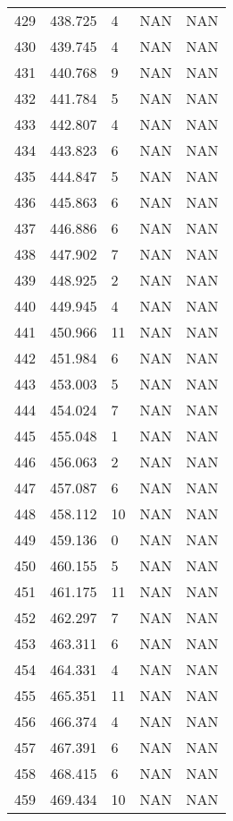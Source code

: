 \documentclass{article}
\begin{document}
\begin{longtable}{@{}lllll@{}}
				429 & 438.725 & 4     & NAN   & NAN   \\
				430 & 439.745 & 4     & NAN   & NAN   \\
				431 & 440.768 & 9     & NAN   & NAN   \\
				432 & 441.784 & 5     & NAN   & NAN   \\
				433 & 442.807 & 4     & NAN   & NAN   \\
				434 & 443.823 & 6     & NAN   & NAN   \\
				435 & 444.847 & 5     & NAN   & NAN   \\
				436 & 445.863 & 6     & NAN   & NAN   \\
				437 & 446.886 & 6     & NAN   & NAN   \\
				438 & 447.902 & 7     & NAN   & NAN   \\
				439 & 448.925 & 2     & NAN   & NAN   \\
				440 & 449.945 & 4     & NAN   & NAN   \\
				441 & 450.966 & 11    & NAN   & NAN   \\
				442 & 451.984 & 6     & NAN   & NAN   \\
				443 & 453.003 & 5     & NAN   & NAN   \\
				444 & 454.024 & 7     & NAN   & NAN   \\
				445 & 455.048 & 1     & NAN   & NAN   \\
				446 & 456.063 & 2     & NAN   & NAN   \\
				447 & 457.087 & 6     & NAN   & NAN   \\
				448 & 458.112 & 10    & NAN   & NAN   \\
				449 & 459.136 & 0     & NAN   & NAN   \\
				450 & 460.155 & 5     & NAN   & NAN   \\
				451 & 461.175 & 11    & NAN   & NAN   \\
				452 & 462.297 & 7     & NAN   & NAN   \\
				453 & 463.311 & 6     & NAN   & NAN   \\
				454 & 464.331 & 4     & NAN   & NAN   \\
				455 & 465.351 & 11    & NAN   & NAN   \\
				456 & 466.374 & 4     & NAN   & NAN   \\
				457 & 467.391 & 6     & NAN   & NAN   \\
				458 & 468.415 & 6     & NAN   & NAN   \\
				459 & 469.434 & 10    & NAN   & NAN   \\

\end{longtable}
\end{document}
